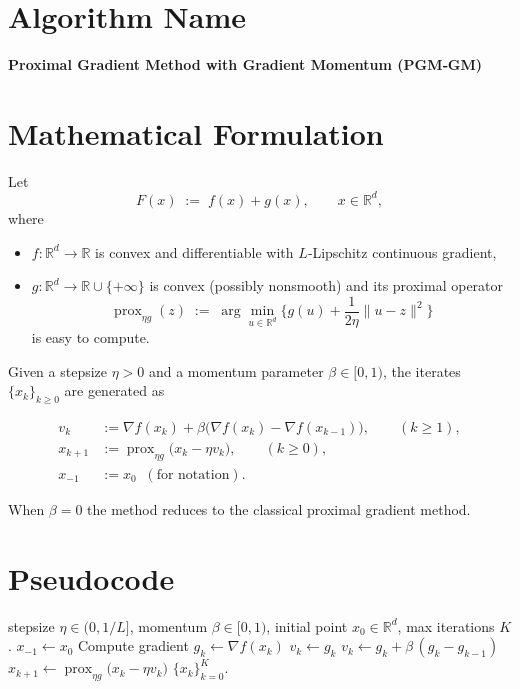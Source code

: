 \documentclass[11pt]{article}
\newcommand{\prox}{\operatorname{prox}}
\newcommand{\grad}{\nabla}
\newcommand{\R}{\mathbb{R}}
\begin{document}
\section*{Algorithm Name}
\textbf{Proximal Gradient Method with Gradient Momentum (PGM‑GM)}

\section*{Mathematical Formulation}
Let  
\[
F(x)\;:=\;f(x)+g(x),\qquad x\in\R^{d},
\]
where  

\begin{itemize}
  \item $f:\R^{d}\rightarrow\R$ is convex and differentiable with $L$‑Lipschitz continuous gradient,
  \item $g:\R^{d}\rightarrow\R\cup\{+\infty\}$ is convex (possibly nonsmooth) and its proximal operator
  \[
  \prox_{\eta g}(z)\;:=\;\arg\min_{u\in\R^{d}}\Big\{ g(u)+\frac1{2\eta}\|u-z\|^{2}\Big\}
  \]
  is easy to compute.
\end{itemize}

Given a stepsize $\eta>0$ and a momentum parameter $\beta\in[0,1)$, the iterates $\{x_k\}_{k\ge 0}$ are generated as  

\[
\boxed{
\begin{aligned}
v_k &:= \grad f(x_k) + \beta\big(\grad f(x_k)-\grad f(x_{k-1})\big), \qquad (k\ge 1),\\[4pt]
x_{k+1} &:= \prox_{\eta g}\!\big(x_k-\eta v_k\big),\qquad (k\ge 0),\\[4pt]
x_{-1}&:=x_0\;\;(\text{for notation}).
\end{aligned}}
\]

When $\beta=0$ the method reduces to the classical proximal gradient method.

\section*{Pseudocode}
\begin{algorithm}[H]
\caption{PGM‑GM}
\begin{algorithmic}[1]
\Require stepsize $\eta\in(0,1/L]$, momentum $\beta\in[0,1)$, initial point $x_0\in\R^{d}$, max iterations $K$.
\State $x_{-1}\gets x_0$ 
    \State Compute gradient $g_k\gets \grad f(x_k)$
        \State $v_k\gets g_k$ 
    \Else
        \State $v_k\gets g_k+\beta\,(g_k-g_{k-1})$
    \EndIf
    \State $x_{k+1}\gets \prox_{\eta g}\!\big(x_k-\eta v_k\big)$
\EndFor
\Ensure $\{x_k\}_{k=0}^{K}$.
\end{algorithmic}
\end{algorithm}
\end{document}
